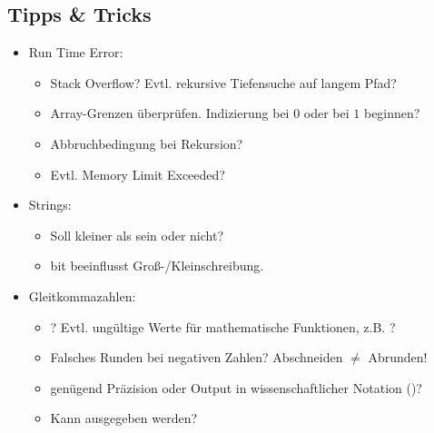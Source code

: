 \subsection{Tipps \& Tricks}

\begin{itemize}
	\item Run Time Error:
	\begin{itemize}
		\item Stack Overflow? Evtl. rekursive Tiefensuche auf langem Pfad?
		\item Array-Grenzen überprüfen. Indizierung bei $0$ oder bei $1$ beginnen?
		\item Abbruchbedingung bei Rekursion?
		\item Evtl. Memory Limit Exceeded?
	\end{itemize}
	
	\item Strings:
	\begin{itemize}
		\item Soll  kleiner als  sein oder nicht?
		\item bit  beeinflusst Groß-/Kleinschreibung.
	\end{itemize}
	
	\item Gleitkommazahlen:
	\begin{itemize}
		\item {}? Evtl. ungültige Werte für mathematische Funktionen, z.B. \mbox{}?
		\item Falsches Runden bei negativen Zahlen? Abschneiden $\neq$ Abrunden!
		\item genügend Präzision oder Output in wissenschaftlicher Notation ()?
		\item Kann  ausgegeben werden?
	\end{itemize}


\end{itemize}
